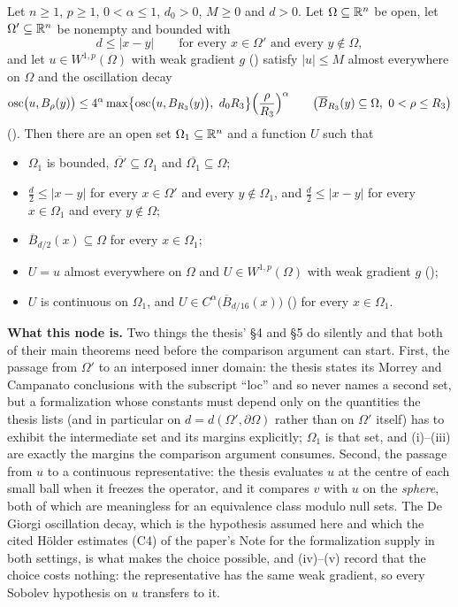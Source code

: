 \begin{lemma}
Let $n\ge1$, $p\ge1$, $0<\alpha\le1$, $d_0>0$, $M\ge0$ and $d>0$.  Let
$\Omega\subseteq\mathbb{R}^n$ be open, let $\Omega'\subseteq\mathbb{R}^n$ be nonempty and
bounded with
\[
d\le|x-y|\qquad\text{for every }x\in\Omega'\text{ and every }y\notin\Omega ,
\]
and let $u\in W^{1,p}(\Omega)$ with weak gradient $g$ ()
satisfy $|u|\le M$ almost everywhere on $\Omega$ and the oscillation decay
\[
\operatorname*{osc}\bigl(u,B_\rho(y)\bigr)\le4^\alpha
\max\bigl\{\operatorname*{osc}\bigl(u,B_{R_3}(y)\bigr),\ d_0R_3\bigr\}
\Bigl(\frac\rho{R_3}\Bigr)^\alpha
\qquad\bigl(\overline B_{R_3}(y)\subseteq\Omega,\ 0<\rho\le R_3\bigr)
\]
().  Then there are an open set $\Omega_1\subseteq\mathbb{R}^n$ and a
function $U$ such that
\begin{itemize}
\item[(i)] $\Omega_1$ is bounded, $\overline{\Omega'}\subseteq\Omega_1$ and
  $\overline{\Omega_1}\subseteq\Omega$;
\item[(ii)] $\frac d2\le|x-y|$ for every $x\in\Omega'$ and every
  $y\notin\Omega_1$, and $\frac d2\le|x-y|$ for every $x\in\Omega_1$ and every
  $y\notin\Omega$;
\item[(iii)] $\overline B_{d/2}(x)\subseteq\Omega$ for every $x\in\Omega_1$;
\item[(iv)] $U=u$ almost everywhere on $\Omega$ and $U\in W^{1,p}(\Omega)$ with
  weak gradient $g$ ();
\item[(v)] $U$ is continuous on $\Omega_1$, and
  $U\in C^\alpha\bigl(\overline B_{d/16}(x)\bigr)$ () for
  every $x\in\Omega_1$.
\end{itemize}

\noindent\textbf{What this node is.}  Two things the thesis' \S4 and \S5 do
silently and that both of their main theorems need before the comparison
argument can start.  First, the passage from $\Omega'$ to an interposed inner
domain: the thesis states its Morrey and Campanato conclusions with the
subscript ``loc'' and so never names a second set, but a formalization whose
constants must depend only on the quantities the thesis lists (and in
particular on $d=d(\Omega',\partial\Omega)$ rather than on $\Omega'$ itself)
has to exhibit the intermediate set and its margins explicitly; $\Omega_1$ is
that set, and (i)--(iii) are exactly the margins the comparison argument
consumes.  Second, the passage from $u$ to a continuous representative: the
thesis evaluates $u$ at the centre of each small ball when it freezes the
operator, and it compares $v$ with $u$ on the \emph{sphere}, both of which are
meaningless for an equivalence class modulo null sets.  The De Giorgi
oscillation decay, which is the hypothesis assumed here and which the cited
H\"older estimates (C4) of the paper's Note for the formalization supply in both
settings, is what makes the choice possible, and (iv)--(v) record that
the choice costs nothing: the representative has the same weak gradient, so
every Sobolev hypothesis on $u$ transfers to it.


\end{lemma}
